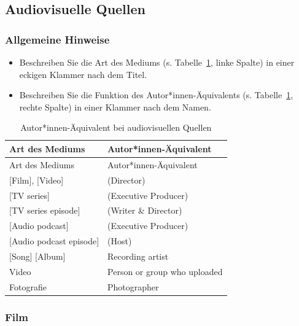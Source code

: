 \documentclass[
  letterpaper,
  DIV=11]{scrreprt}
\begin{document}
\hypertarget{audiovisuelle-quellen}{%
\subsection{Audiovisuelle Quellen}\label{audiovisuelle-quellen}}

\hypertarget{allgemeine-hinweise-4}{%
\subsubsection{\texorpdfstring{\textbf{Allgemeine
Hinweise}}{Allgemeine Hinweise}}\label{allgemeine-hinweise-4}}

\begin{itemize}
\item
  Beschreiben Sie die Art des Mediums (s. Tabelle~\ref{tbl-audiovisual},
  linke Spalte) in einer eckigen Klammer nach dem Titel.
\item
  Beschreiben Sie die Funktion des Autor*innen-Äquivalents (s.
  Tabelle~\ref{tbl-audiovisual}, rechte Spalte) in einer Klammer nach
  dem Namen.
\end{itemize}

\hypertarget{tbl-audiovisual}{}
\begin{longtable}[]{@{}ll@{}}
\caption{\label{tbl-audiovisual}Autor*innen-Äquivalent bei
audiovisuellen Quellen}\tabularnewline
\toprule()
Art des Mediums & Autor*innen-Äquivalent \\
\midrule()
\endfirsthead
\toprule()
Art des Mediums & Autor*innen-Äquivalent \\
\midrule()
\endhead
{[}Film{]}, {[}Video{]} & (Director) \\
{[}TV series{]} & (Executive Producer) \\
{[}TV series episode{]} & (Writer \& Director) \\
{[}Audio podcast{]} & (Executive Producer) \\
{[}Audio podcast episode{]} & (Host) \\
{[}Song{]} {[}Album{]} & Recording artist \\
Video & Person or group who uploaded \\
Fotografie & Photographer \\
\bottomrule()
\end{longtable}

\hypertarget{film}{%
\subsubsection{Film}\label{film}}
\end{document}
